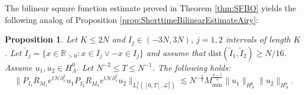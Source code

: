 \documentclass{amsart}
\newtheorem{proposition}[theorem]{Proposition}
\theoremstyle{definition}
\newcommand{\R}{\mathbb{R}}
\begin{document}
The bilinear square function estimate proved in Theorem \ref{thm:SFBO} yields the following analog of Proposition \ref{prop:ShorttimeBilinearEstimateAiry}:
\begin{proposition}
\label{prop:ShorttimeBilinearBO}
Let $K \leq 2N$ and $I_j \in (-3N,3N)$, $j=1,2$ intervals of length $K$. Let $\tilde{I}_j = \{ x \in \R_{>0} : x \in I_j \vee -x \in I_j\}$ and assume that $\text{dist}(\tilde{I}_1,\tilde{I}_2) \geq N/16$. Assume $u_1,u_2 \in H^0_{\Lambda}$. Let $N^{-2} \leq T \leq N^{-1}$. The following holds:
\begin{equation*}
\| P_{I_1} R_{M_1} e^{t \mathcal{H} \partial_x^2} u_1 P_{I_2} R_{M_2} e^{t \mathcal{H} \partial_x^2} u_2 \|_{L^2_t([0,T],\mathcal{L}^2_x)} \lesssim N^{-\frac{1}{2}} M_{\min}^{\frac{\nu-1}{2}} \| u_1 \|_{H^0_{\Lambda}} \| u_2 \|_{H^0_{\Lambda}}.
\end{equation*}
\end{proposition}
\end{document}
